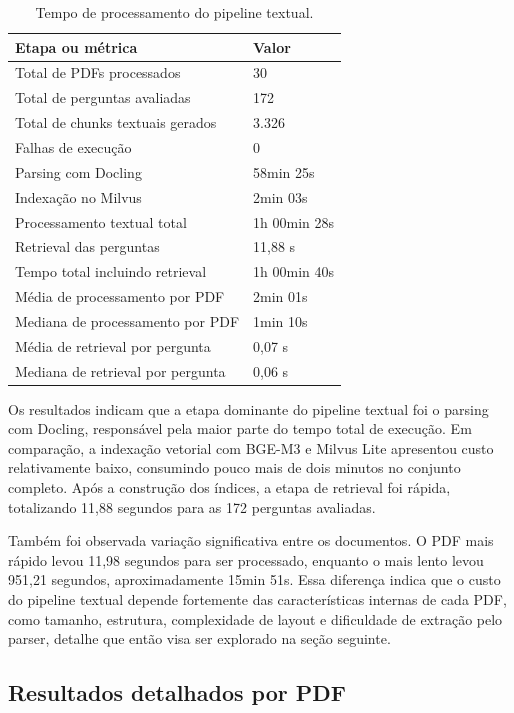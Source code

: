 \begin{table}[htbp]
\centering
\caption{Tempo de processamento do pipeline textual.}
\label{tab:tempo-processamento-textual}
\small
\begin{tabular}{p{7.8cm}p{4.8cm}}
\toprule
\textbf{Etapa ou métrica} & \textbf{Valor} \\
\midrule
Total de PDFs processados & 30 \\
Total de perguntas avaliadas & 172 \\
Total de chunks textuais gerados & 3.326 \\
Falhas de execução & 0 \\
\addlinespace
Parsing com Docling & 58min 25s \\
Indexação no Milvus & 2min 03s \\
Processamento textual total & 1h 00min 28s \\
Retrieval das perguntas & 11,88 s \\
Tempo total incluindo retrieval & 1h 00min 40s \\
\addlinespace
Média de processamento por PDF & 2min 01s \\
Mediana de processamento por PDF & 1min 10s \\
Média de retrieval por pergunta & 0,07 s \\
Mediana de retrieval por pergunta & 0,06 s \\
\bottomrule
\end{tabular}
\end{table}

Os resultados indicam que a etapa dominante do pipeline textual foi o parsing com Docling, responsável pela maior parte do tempo total de execução. Em comparação, a indexação vetorial com BGE-M3 e Milvus Lite apresentou custo relativamente baixo, consumindo pouco mais de dois minutos no conjunto completo. Após a construção dos índices, a etapa de retrieval foi rápida, totalizando 11,88 segundos para as 172 perguntas avaliadas.

Também foi observada variação significativa entre os documentos. O PDF mais rápido levou 11,98 segundos para ser processado, enquanto o mais lento levou 951,21 segundos, aproximadamente 15min 51s. Essa diferença indica que o custo do pipeline textual depende fortemente das características internas de cada PDF, como tamanho, estrutura, complexidade de layout e dificuldade de extração pelo parser, detalhe que então visa ser explorado na seção seguinte.

\subsection{Resultados detalhados por PDF}

